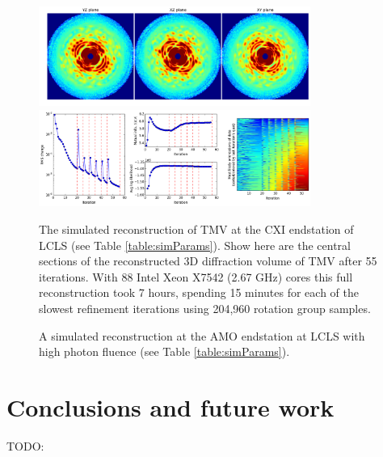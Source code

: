 \documentclass[]{iucr}              %
\begin{document}
\begin{figure}
\caption{The simulated reconstruction of TMV at the CXI endstation of LCLS (see Table \ref{table:simParams}). Show here are the central sections of the reconstructed 3D diffraction volume of TMV after 55 iterations. With 88 Intel Xeon X7542 (2.67 GHz) cores this full reconstruction took 7 hours, spending 15 minutes for each of the slowest refinement iterations using 204,960 rotation group samples.}
\includegraphics[width=3.5in]{figures/cxi_intens_055.png} \label{fig:cxi_intens}
\includegraphics[width=3.5in]{figures/cxi_log_fig.png} \label{fig:cxi_log_fig}
\end{figure}

\begin{figure}
\caption{A simulated reconstruction at the AMO endstation at LCLS with high photon fluence (see Table \ref{table:simParams}).}
\end{figure}


\section{Conclusions and future work}

TODO:


\appendix
\end{document}
